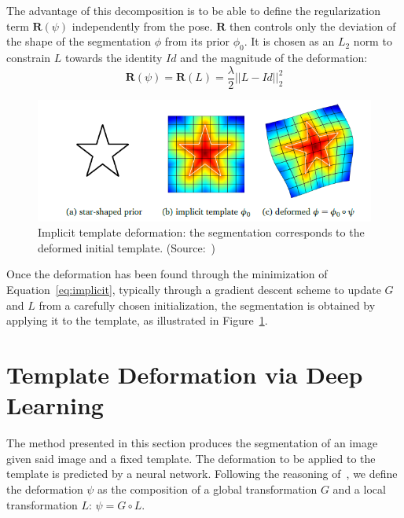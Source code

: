 The advantage of this decomposition is to be able to define the regularization term $\mathbf{R} \left( \psi \right)$  independently from the pose. $\mathbf{R}$ then controls only the deviation of the shape of the segmentation $\phi$ from its prior $\phi_0$. It is chosen as an $L_2$ norm to constrain $L$ towards the identity $Id$ and the magnitude of the deformation:
\begin{equation}
    \mathbf{R} \left( \psi \right) = \mathbf{R} \left( L \right) = \frac{\lambda}{2} || L - Id ||^2_2
\end{equation}

\begin{figure}[htbp]
	\includegraphics[width=\textwidth]{img_seg/implicit}
    \caption{Implicit template deformation: the segmentation corresponds to the deformed initial template. (Source:~\textcite{mory2011})}
    \label{fig:implicit}
\end{figure}

Once the deformation has been found through the minimization of Equation~\ref{eq:implicit}, typically through a gradient descent scheme to update $G$ and $L$ from a carefully chosen initialization, the segmentation is obtained by applying it to the template, as illustrated in Figure~\ref{fig:implicit}.

\section{Template Deformation via Deep Learning}
\label{sec:deformable_dl}

The method presented in this section produces the segmentation of an image given said image and a fixed template. The deformation to be applied to the template is predicted by a neural network. Following the reasoning of~\textcite{mory2012MICCAI}, we define the deformation $\psi$ as the composition of a global transformation $G$ and a local transformation $L$: $\psi = G \circ L$.

